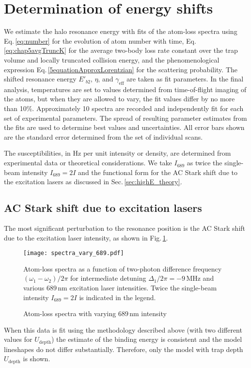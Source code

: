 \section{Determination of energy shifts} \label{sec:lowE_Eb2}
We estimate the halo resonance energy with fits of the atom-loss spectra using Eq.\,\ref{eq:number} for the evolution of atom number with time, Eq.\,\ref{eq:chap5avgTruncK} for the average two-body loss rate constant over the trap volume and locally truncated collision energy, and the phenomenological expression Eq.\,\ref{5equationApproxLorentzian} for the scattering probability.
The shifted resonance energy $E'_{b2}$, $\eta$, and $\gamma_{\text{eff}}$ are taken as fit parameters. 
In the final analysis, temperatures are set to values determined from time-of-flight imaging of the atoms, but when they are allowed to vary, the fit values differ by no more than 10\%.
Approximately 10 spectra are recorded and independently fit for each set of experimental parameters.
The spread of resulting parameter estimates from the fits are used to determine best values and uncertainties.
All error bars shown are the standard error determined from the set of individual scans.

The susceptibilities, in Hz per unit intensity or density, are determined from experimental data or theoretical considerations.
We take $I_{689}$ as twice the single-beam intensity $I_{689}=2I$ and the functional form for the AC Stark shift due to the excitation lasers as discussed in Sec.\,\ref{sec:highE_theory}.

\subsection{AC Stark shift due to excitation lasers}
The most significant perturbation to the resonance position is the AC Stark shift due to the excitation laser intensity, as shown in Fig.\,\ref{fig:SpectraVarying689Intensity}.
	\begin{figure} 
	\centerline{
	  \texttt{[image: spectra\_vary\_689.pdf]}}
	  \caption{Atom-loss spectra with varying $689$\,nm intensity}{Atom-loss spectra as a function of two-photon difference frequency $(\omega_1-\omega_2)/2\pi$ for intermediate detuning $\Delta_1/2\pi=-9$\,MHz and various $689$\,nm excitation laser intensities. Twice the single-beam intensity $I_{689}=2I$ is indicated in the legend.}
	  \label{fig:SpectraVarying689Intensity}
	\end{figure}
When this data is fit using the methodology described above (with two different values for $U_\text{depth}$) the estimate of the binding energy is consistent and the model lineshapes do not differ substantially.
Therefore, only the model with trap depth $U_\text{depth}$ is shown.
	
